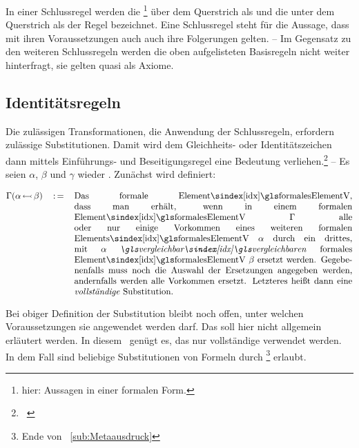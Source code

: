 In einer Schlussregel werden die \footnote{%
	hier: Aussagen in einer formalen Form.%
} über dem Querstrich als \emph{} und die unter dem Querstrich als \emph{} der Regel bezeichnet.
Eine Schlussregel steht für die Aussage, dass mit ihren Voraussetzungen auch auch ihre Folgerungen gelten.
-- Im Gegensatz zu den weiteren Schlussregeln werden die oben aufgelisteten Basisregeln nicht weiter hinterfragt, \textdh sie gelten quasi als Axiome.

\subsection{Identitätsregeln}%
\label{sub:Indentitaetsregeln}

Die zulässigen Transformationen, \textdh die Anwendung der Schlussregeln, erfordern zulässige Substitutionen.
Damit wird dem Gleichheits- oder Identitätszeichen \symqt{$\eq$} dann mittels Einführungs- und Beseitigungsregel eine Bedeutung verliehen.\footnote{\seename~\cite{bib:NatuerlichesSchliessen}}
-- Es seien $\alpha$, $\beta$ und $\gamma$ wieder . Zunächst wird definiert:

\begin{align}
	\Gamma(\alpha \subst \beta) \quad \defeq \quad
	\parbox[t]{11cm}{%
		Das \glsIdxBg{formalesElementV}{formale Element}, dass man erhält, wenn in einem \glsIdxBg{formalesElementV}{formalen Element} $\Gamma$ alle oder nur einige Vorkommen eines weiteren \glsIdxBg{formalesElementV}{formalen Elements} $\alpha$ durch ein drittes, mit $\alpha$ \emph{\glsIdx{vergleichbar}en} \glsIdxBg{formalesElementV}{formales Element} $\beta$ ersetzt werden.
		Gegebenenfalls muss noch die Auswahl der Ersetzungen angegeben werden, andernfalls werden alle Vorkommen ersetzt.
		Letzteres heißt dann eine \emph{vollständige} Substitution.
	}
	\label{def:Substitution}
\end{align}

Bei obiger Definition der Substitution bleibt noch offen, unter welchen Voraussetzungen sie angewendet werden darf. Das soll hier nicht allgemein erläutert werden. In diesem \sectionname\ genügt es, das nur vollständige  verwendet werden. In dem Fall sind beliebige Substitutionen von Formeln durch \emph{}\footnote{%
	\seename Ende von \subsectionname~\vref{sub:Metaausdruck}
} erlaubt.


